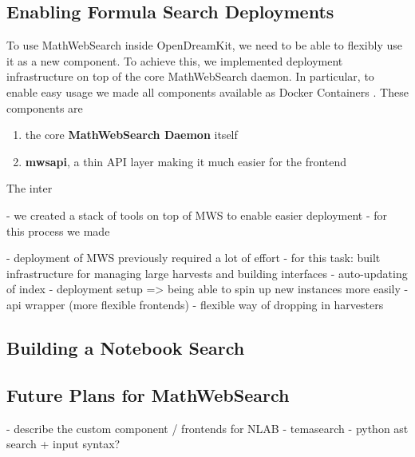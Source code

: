 \subsection{Enabling Formula Search Deployments}

To use MathWebSearch inside OpenDreamKit, we need to be able to flexibly use it as a new component. 
To achieve this, we implemented deployment infrastructure on top of the core MathWebSearch daemon. 
In particular, to enable easy usage we made all components available as Docker Containers . 
These components are

\begin{enumerate}
    \item the core \textbf{MathWebSearch Daemon} itself 
    \item \textbf{mwsapi}, a thin API layer making it much easier for the frontend
\end{enumerate}

The inter

- we created a stack of tools on top of MWS to enable easier deployment
- for this process we made

- deployment of MWS previously required a lot of effort
- for this task: built infrastructure for managing large harvests and building interfaces
    - auto-updating of index
    - deployment setup => being able to spin up new instances more easily
    - api wrapper (more flexible frontends)
    - flexible way of dropping in harvesters

\subsection{Building a Notebook Search}


\subsection{Future Plans for MathWebSearch}

- describe the custom component / frontends for NLAB
- temasearch
- python ast search + input syntax?